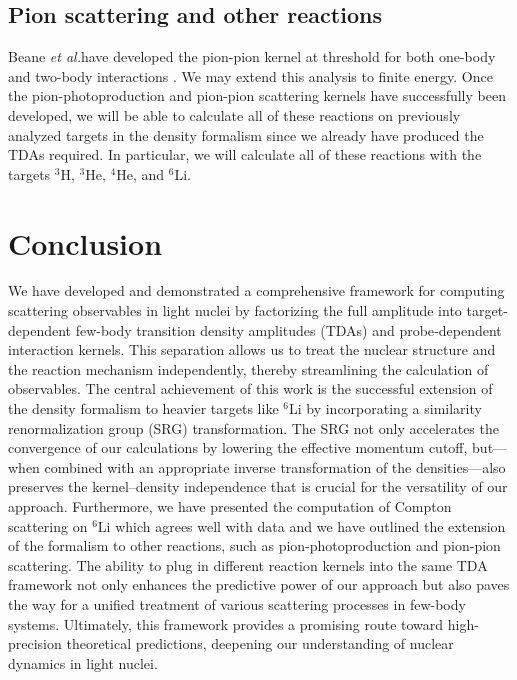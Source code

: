 \documentclass[a4paper,11pt]{article}
\newcommand{\etal}{\textit{et al.}}
\newcommand{\LiS}{{}^{6} \mathrm{Li} }
\newcommand{\HeF}{{}^{4} \mathrm{He}}
\newcommand{\HeT}{{}^{3} \mathrm{He}}
\newcommand{\HThree}{{}^{3} \mathrm{H}}
\begin{document}
\subsection{Pion scattering and other reactions}
Beane \etal have developed the pion-pion kernel at threshold for both
one-body and two-body interactions \cite{Beane2003}.
We may extend this analysis to finite energy.
Once the pion-photoproduction and pion-pion scattering kernels have
successfully been developed, we will be able to calculate all of
these reactions on previously analyzed targets in the density
formalism since we already have produced the TDAs required.
In particular, we will calculate all of these reactions with the
targets $\HThree$, $\HeT$, $\HeF$, and $\LiS$.

\section{Conclusion}
We have developed and demonstrated a comprehensive framework for
computing scattering observables in light nuclei by factorizing the
full amplitude into target‐dependent few-body transition density
amplitudes (TDAs) and probe‐dependent interaction kernels.
This separation allows us to treat the nuclear structure and the
reaction mechanism independently, thereby streamlining the
calculation of observables.
The central achievement of this work is the successful extension of
the density formalism to heavier targets like $\LiS$ by incorporating a
similarity renormalization group (SRG) transformation.
The SRG not only accelerates the convergence of our calculations by
lowering the effective momentum cutoff, but—when combined with an
appropriate inverse transformation of the densities—also preserves
the kernel–density independence that is crucial for the versatility
of our approach.
Furthermore, we have presented the computation of Compton scattering on $\LiS$ which agrees
well with data and we have outlined the extension of the formalism to other
reactions, such as pion-photoproduction and pion-pion scattering. The
ability to plug in different reaction kernels into the same TDA
framework not only enhances the predictive power of our approach but
also paves the way for a unified treatment of various scattering
processes in few-body systems.
Ultimately, this framework provides a promising route toward
high-precision theoretical predictions, deepening our understanding
of nuclear dynamics in light nuclei.
\end{document}
